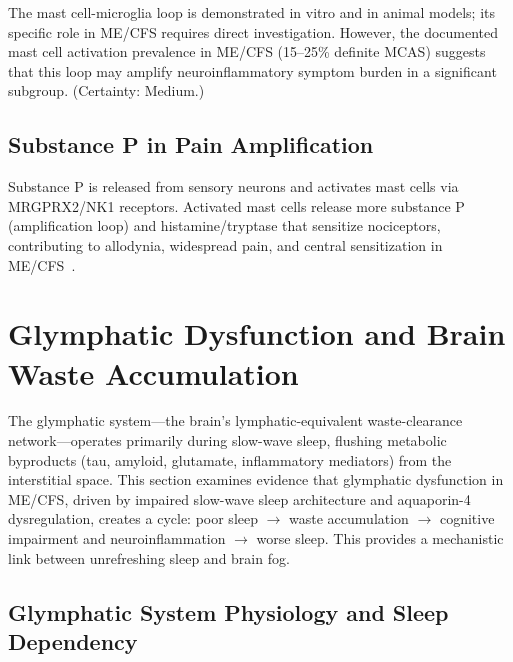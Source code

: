 \begin{hypothesis}
\label{hyp:ch15-mastcell-microglia-loop}
The mast cell-microglia loop is demonstrated in vitro and in animal models; its specific role in ME/CFS requires direct investigation. However, the documented mast cell activation prevalence in ME/CFS (15--25\% definite MCAS) suggests that this loop may amplify neuroinflammatory symptom burden in a significant subgroup. (Certainty: Medium.)
\end{hypothesis}

\subsection{Substance P in Pain Amplification}

Substance P is released from sensory neurons and activates mast cells via MRGPRX2/NK1 receptors. Activated mast cells release more substance P (amplification loop) and histamine/tryptase that sensitize nociceptors, contributing to allodynia, widespread pain, and central sensitization in ME/CFS~\cite{Kempuraj2016neuroinflammation, Lakatos2025mastMicroglia}.


\section{Glymphatic Dysfunction and Brain Waste Accumulation}
\label{sec:ch15-glymphatic}

The glymphatic system---the brain's lymphatic-equivalent waste-clearance network---operates primarily during slow-wave sleep, flushing metabolic byproducts (tau, amyloid, glutamate, inflammatory mediators) from the interstitial space. This section examines evidence that glymphatic dysfunction in ME/CFS, driven by impaired slow-wave sleep architecture and aquaporin-4 dysregulation, creates a cycle: poor sleep $\to$ waste accumulation $\to$ cognitive impairment and neuroinflammation $\to$ worse sleep. This provides a mechanistic link between unrefreshing sleep and brain fog.

\subsection{Glymphatic System Physiology and Sleep Dependency}

